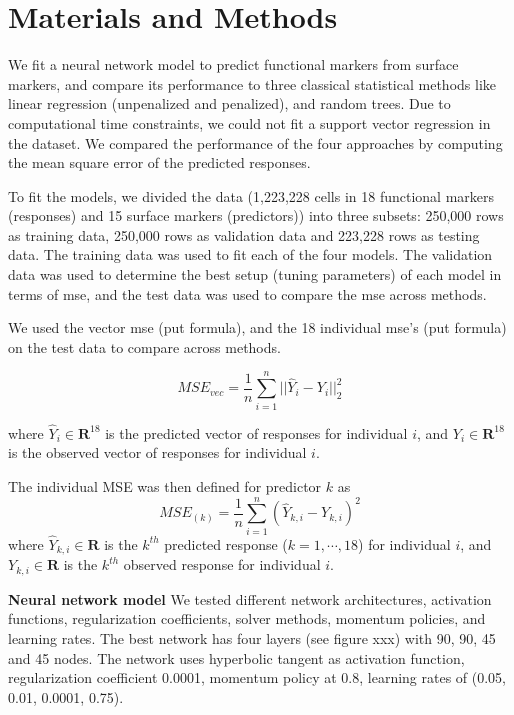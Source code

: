 \documentclass[graybox]{svmult}
\begin{document}
\section{Materials and Methods}

We fit a neural network model to predict functional markers from
surface markers, and compare its performance to three classical
statistical methods like linear regression (unpenalized and
penalized), and random trees. Due to computational time constraints,
we could not fit a support vector regression in the dataset. We
compared the performance of the four approaches by computing the mean
square error of the predicted responses.

To fit the models, we divided the data (1,223,228 cells in 18
functional markers (responses) and 15 surface markers (predictors))
into three subsets: 250,000 rows as training data, 250,000 rows as
validation data and 223,228 rows as testing data. The training data
was used to fit each of the four models. The validation data was used
to determine the best setup (tuning parameters) of each model in terms
of mse, and the test data was used to compare the mse across methods.

We used the vector mse (put formula), and the 18 individual mse's (put
formula) on the test data to compare across methods.

\begin{equation}
MSE_{vec} = \frac{1}{n} \sum_{i=1}^n ||\hat{Y}_i - Y_i ||^2_2
\label{vectorMSEformula}
\end{equation}

where $\hat{Y}_i \in \mathbf{R}^{18}$ is the predicted vector of
responses for individual $i$, and $Y_i \in \mathbf{R}^{18}$ is the
observed vector of responses for individual $i$.

The individual MSE was then defined for predictor $k$ as
\begin{equation}
MSE_{(k)} = \frac{1}{n} \sum_{i=1}^n (\hat{Y}_{k,i} - Y_{k,i} )^2
\label{MSEformula}
\end{equation}
where $\hat{Y}_{k,i} \in \mathbf{R}$ is the $k^{th}$ predicted
response ($k=1,\cdots,18$) for individual $i$, and $Y_{k,i} \in
\mathbf{R}$ is the $k^{th}$ observed response for individual $i$.

\vspace{0.25cm}
\noindent \textbf{Neural network model} We tested different network
architectures, activation functions, regularization coefficients,
solver methods, momentum policies, and learning rates. The best
network has four layers (see figure xxx) with 90, 90, 45 and 45
nodes. The network uses hyperbolic tangent as activation function,
regularization coefficient 0.0001, momentum policy at 0.8, learning
rates of (0.05, 0.01, 0.0001, 0.75).
\end{document}
